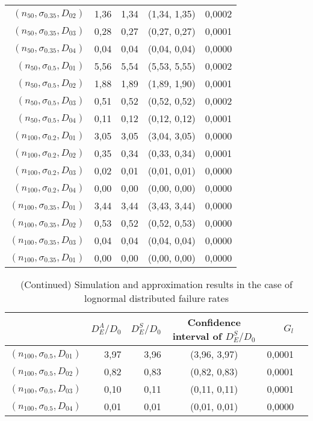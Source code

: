 \documentclass[preprint,12pt]{elsarticle}
\begin{document}
\begin{table}[htbp]
\begin{tabular}{rrrcr}
    $(n_{50},\sigma_{0.35},D_{02})$ & 1,36  & 1,34  & (1,34, 1,35) & 0,0002 \\
    $(n_{50},\sigma_{0.35},D_{03})$& 0,28  & 0,27  & (0,27, 0,27) & 0,0001 \\
    $(n_{50},\sigma_{0.35},D_{04})$ & 0,04  & 0,04  & (0,04, 0,04) & 0,0000 \\
    $(n_{50},\sigma_{0.5},D_{01})$ & 5,56  & 5,54  & (5,53, 5,55) & 0,0002 \\
    $(n_{50},\sigma_{0.5},D_{02})$& 1,88  & 1,89  & (1,89, 1,90) & 0,0001 \\
    $(n_{50},\sigma_{0.5},D_{03})$ & 0,51  & 0,52  & (0,52, 0,52) & 0,0002 \\
    $(n_{50},\sigma_{0.5},D_{04})$ & 0,11  & 0,12  & (0,12, 0,12) & 0,0001 \\
   $(n_{100},\sigma_{0.2},D_{01})$ & 3,05  & 3,05  & (3,04, 3,05) & 0,0000 \\
   $(n_{100},\sigma_{0.2},D_{02})$  & 0,35  & 0,34  & (0,33, 0,34) & 0,0001 \\
   $(n_{100},\sigma_{0.2},D_{03})$  & 0,02  & 0,01  & (0,01, 0,01) & 0,0000 \\
   $(n_{100},\sigma_{0.2},D_{04})$  & 0,00  & 0,00  & (0,00, 0,00) & 0,0000 \\
   $(n_{100},\sigma_{0.35},D_{01})$ & 3,44  & 3,44  & (3,43, 3,44) & 0,0000 \\
   $(n_{100},\sigma_{0.35},D_{02})$ & 0,53  & 0,52  & (0,52, 0,53) & 0,0000 \\
   $(n_{100},\sigma_{0.35},D_{03})$& 0,04  & 0,04  & (0,04, 0,04) & 0,0000 \\
   $(n_{100},\sigma_{0.35},D_{01})$ & 0,00  & 0,00  & (0,00, 0,00) & 0,0000 \\
    \bottomrule
    \end{tabular}%
  \label{lognormal1}%
\end{table}%

\begin{table}[htbp]
  \centering
  \caption{(Continued) Simulation and approximation results in the case of lognormal distributed failure rates}
    \begin{tabular}{rrrcrr}
    \toprule
          & $D_{E}^{A}/D_0$ & $D_{E}^{S}/D_0$ & Confidence interval of $D_{E}^{S}/D_0$ &  $G_{l}$ \\
    \midrule
 $(n_{100},\sigma_{0.5},D_{01})$  & 3,97  & 3,96  & (3,96, 3,97) & 0,0001 \\
   $(n_{100},\sigma_{0.5},D_{02})$ & 0,82  & 0,83  & (0,82, 0,83) & 0,0001 \\
   $(n_{100},\sigma_{0.5},D_{03})$ & 0,10  & 0,11  & (0,11, 0,11) & 0,0001 \\
   $(n_{100},\sigma_{0.5},D_{04})$ & 0,01  & 0,01  & (0,01, 0,01) & 0,0000 \\
      \bottomrule
     \end{tabular}%
  \label{lognormal2}%
\end{table}%
\end{document}
